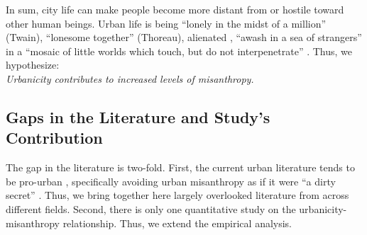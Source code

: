 \documentclass[11pt, letterpaper]{article}
\begin{document}
\begin{spacing}{1.4}
% 



In sum, city life can make people become more
distant from or hostile toward other human beings. %
Urban life is being ``lonely in the midst of a million'' (Twain), ``lonesome together''
(Thoreau), alienated \citep{wirth38,nettler1957measure}, ``awash in a sea of strangers''
\citep[Merry cited in][p. 99]{wilson85} in a ``mosaic of little worlds which touch, but do not interpenetrate'' \citep[][p. 40]{park84}. Thus, we hypothesize: \\
 
{\indent\hspace{1in}\textit{Urbanicity contributes to increased levels of misanthropy.\\}}
     

\subsection*{Gaps in the Literature and Study's Contribution} 

The gap in the literature is two-fold. First, the current urban literature tends to
 be pro-urban \citep{thrift05,amin06,aokCityBook15,peck16}, specifically avoiding urban misanthropy as if it were ``a
dirty secret'' \citep[p. 134]{thrift05}. Thus, we bring together here largely
 overlooked literature from across different fields. Second,
there is only one quantitative study on the urbanicity-misanthropy
relationship. Thus, we extend the empirical analysis. 


\end{spacing}
\end{document}
